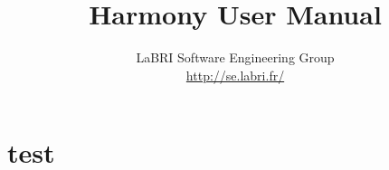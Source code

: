 \documentclass[a4paper, 11pt]{report}
\title{Harmony User Manual}
\author{LaBRI Software Engineering Group \\\url{http://se.labri.fr/}}
\begin{document}
 
\maketitle
 
\tableofcontents

\chapter{test}




\end{document}
